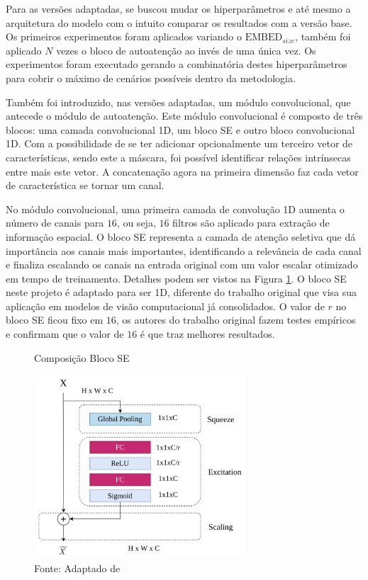 Para as versões adaptadas, se buscou mudar os hiperparâmetros e até mesmo a arquitetura do modelo com o intuito comparar os resultados com a versão base. Os primeiros experimentos foram aplicados variando o $\text{EMBED}_{size}$, também foi aplicado $N$ vezes o bloco de autoatenção ao invés de uma única vez. Os experimentos foram executado gerando a combinatória destes hiperparâmetros para cobrir o máximo de cenários possíveis dentro da metodologia.

Também foi introduzido, nas versões adaptadas, um módulo convolucional, que antecede o módulo de autoatenção. Este módulo convolucional é composto de três blocos: uma camada convolucional 1D, um bloco \gls{SE} e outro bloco convolucional 1D. Com a possibilidade de se ter adicionar opcionalmente um terceiro vetor de características, sendo este a máscara, foi possível identificar relações intrínsecas entre mais este vetor. A concatenação agora na primeira dimensão faz cada vetor de característica se tornar um canal. 

No módulo convolucional, uma primeira camada de convolução 1D aumenta o número de canais para $16$, ou seja, $16$ filtros são aplicado para extração de informação espacial. O bloco \gls{SE} representa a camada de atenção seletiva que dá importância aos canais mais importantes, identificando a relevância de cada canal e finaliza escalando os canais na entrada original com um valor escalar otimizado em tempo de treinamento. Detalhes podem ser vistos na Figura \ref{fig:fig031}. O bloco \gls{SE} neste projeto é adaptado para ser 1D, diferente do trabalho original que visa sua aplicação em modelos de visão computacional já consolidados. O valor de $r$ no bloco \gls{SE} ficou fixo em $16$, os autores do trabalho original fazem testes empíricos e confirmam que o valor de $16$ é que traz melhores resultados.

\begin{figure}[h!]
    \centering
    \caption{Composição Bloco SE}
    \includegraphics[width=0.7\textwidth]{figures/fig031.png}
    \caption*{Fonte: Adaptado de \cite{lafraxoSEDARUnetSqueezeexcitationDilated2024}}
    \label{fig:fig031}
\end{figure}



